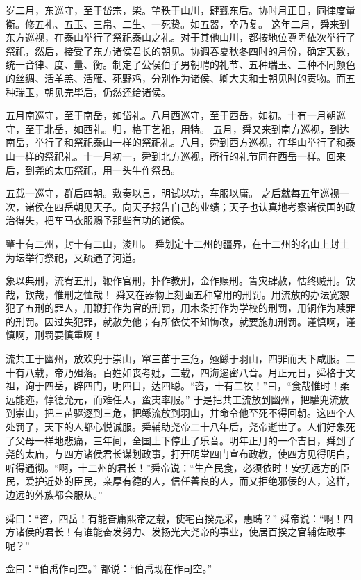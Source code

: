 \documentclass[a4paper,12pt,UTF8,twoside]{ctexbook}
\begin{document}
岁二月，东巡守，至于岱宗，柴。望秩于山川，肆觐东后。协时月正日，同律度量衡。修五礼、五玉、三帛、二生、一死贽。如五器，卒乃复。
这年二月，舜来到东方巡视，在泰山举行了祭祀泰山之礼。对于其他山川，都按地位尊卑依次举行了祭祀，然后，接受了东方诸侯君长的朝见。协调春夏秋冬四时的月份，确定天数，统一音律、度、量、衡。制定了公侯伯子男朝聘的礼节、五种瑞玉、三种不同颜色的丝绸、活羊羔、活雁、死野鸡，分别作为诸侯、卿大夫和士朝见时的贡物。而五种瑞玉，朝见完毕后，仍然还给诸侯。

五月南巡守，至于南岳，如岱礼。八月西巡守，至于西岳，如初。十有一月朔巡守，至于北岳，如西礼。归，格于艺祖，用特。
五月，舜又来到南方巡视，到达南岳，举行了和祭祀泰山一样的祭祀礼。八月，舜到西方巡视，在华山举行了和泰山一样的祭祀礼。十一月初一，舜到北方巡视，所行的礼节同在西岳一样。回来后，到尧的太庙祭祀，用一头牛作祭品。

五载一巡守，群后四朝。敷奏以言，明试以功，车服以庸。
之后就每五年巡视一次，诸侯在四岳朝见天子。向天子报告自己的业绩；天子也认真地考察诸侯国的政治得失，把车马衣服赐予那些有功的诸侯。

肇十有二州，封十有二山，浚川。
舜划定十二州的疆界，在十二州的名山上封土为坛举行祭祀，又疏通了河道。

象以典刑，流宥五刑，鞭作官刑，扑作教刑，金作赎刑。眚灾肆赦，怙终贼刑。钦哉，钦哉，惟刑之恤哉！
舜又在器物上刻画五种常用的刑罚。用流放的办法宽恕犯了五刑的罪人，用鞭打作为官的刑罚，用木条打作为学校的刑罚，用铜作为赎罪的刑罚。因过失犯罪，就赦免他；有所依仗不知悔改，就要施加刑罚。谨慎啊，谨慎啊，刑罚要慎重啊！

流共工于幽州，放欢兜于崇山，窜三苗于三危，殛鲧于羽山，四罪而天下咸服。二十有八载，帝乃殂落。百姓如丧考妣，三载，四海遏密八音。月正元日，舜格于文祖，询于四岳，辟四门，明四目，达四聪。“咨，十有二牧！”曰，“食哉惟时！柔远能迩，惇德允元，而难任人，蛮夷率服。”
于是把共工流放到幽州，把驩兜流放到崇山，把三苗驱逐到三危，把鲧流放到羽山，并命令他至死不得回朝。这四个人处罚了，天下的人都心悦诚服。舜辅助尧帝二十八年后，尧帝逝世了。人们好象死了父母一样地悲痛，三年间，全国上下停止了乐音。明年正月的一个吉日，舜到了尧的太庙，与四方诸侯君长谋划政事，打开明堂四门宣布政教，使四方见得明白，听得通彻。“啊，十二州的君长！”舜帝说：“生产民食，必须依时！安抚远方的臣民，爱护近处的臣民，亲厚有德的人，信任善良的人，而又拒绝邪佞的人，这样，边远的外族都会服从。”

舜曰：“咨，四岳！有能奋庸熙帝之载，使宅百揆亮采，惠畴？”
舜帝说：“啊！四方诸侯的君长！有谁能奋发努力、发扬光大尧帝的事业，使居百揆之官辅佐政事呢？”

佥曰：“伯禹作司空。”
都说：“伯禹现在作司空。”
\end{document}
